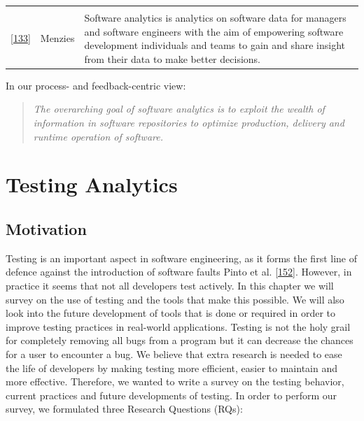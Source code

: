 \documentclass[]{book}
\begin{document}
\begin{longtable}[]{@{}ccl@{}}
\begin{minipage}[t]{0.76\columnwidth}
\end{minipage}\tabularnewline
\begin{minipage}[t]{0.07\columnwidth}\centering\strut
{[}\protect\hyperlink{ref-Menzi13}{133}{]}\strut
\end{minipage} & \begin{minipage}[t]{0.08\columnwidth}\centering\strut
Menzies\strut
\end{minipage} & \begin{minipage}[t]{0.76\columnwidth}\raggedright\strut
Software analytics is analytics on software data for managers and
software engineers with the aim of empowering software development
individuals and teams to gain and share insight from their data to make
better decisions.\strut
\end{minipage}\tabularnewline
\bottomrule
\end{longtable}

In our process- and feedback-centric view:

\begin{quote}
\emph{The overarching goal of \emph{software analytics} is to exploit
the wealth of information in software repositories to optimize
production, delivery and runtime operation of software.}
\end{quote}

\chapter{Testing Analytics}\label{testing-analytics}

\section{Motivation}\label{motivation}

Testing is an important aspect in software engineering, as it forms the
first line of defence against the introduction of software faults Pinto
et al. {[}\protect\hyperlink{ref-pinto2012understanding}{152}{]}.
However, in practice it seems that not all developers test actively. In
this chapter we will survey on the use of testing and the tools that
make this possible. We will also look into the future development of
tools that is done or required in order to improve testing practices in
real-world applications. Testing is not the holy grail for completely
removing all bugs from a program but it can decrease the chances for a
user to encounter a bug. We believe that extra research is needed to
ease the life of developers by making testing more efficient, easier to
maintain and more effective. Therefore, we wanted to write a survey on
the testing behavior, current practices and future developments of
testing. In order to perform our survey, we formulated three Research
Questions (RQs):
\end{document}
